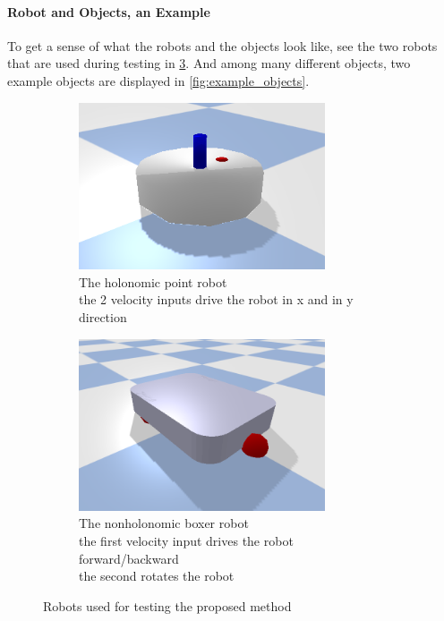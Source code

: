 \paragraph{Robot and Objects, an Example}
To get a sense of what the robots and the objects look like, see the two robots that are used during testing in \cref{fig:example_robots}. And among many different objects, two example objects are displayed in \cref{fig:example_objects}.

\begin{figure}[H]
    \centering
    \begin{subfigure}{.5\textwidth}
    \centering
    \includegraphics[width=0.8\textwidth]{figures/point_robot.png}
    \caption{The holonomic point robot\\the 2 velocity inputs drive the robot in \gls{x} and in \gls{y} direction}%
    \label{subfig:example_point_robot}
    \end{subfigure}%
    \begin{subfigure}{.5\textwidth}
    \centering
    \includegraphics[width=0.8\textwidth]{figures/boxer_robot.png}
    \caption{The nonholonomic boxer robot\\the first velocity input drives the robot forward/backward\\the second rotates the robot}%
    \label{subfig:example_boxer_robot}
    \end{subfigure}%
    \caption{Robots used for testing the proposed method}%
    \label{fig:example_robots}
\end{figure}


